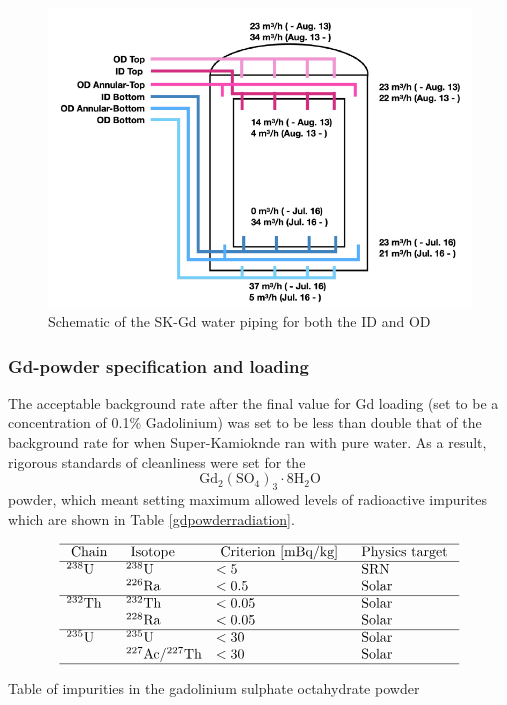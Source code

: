 \begin{figure}[H]
    \includegraphics[width=\textwidth]{Figures/gd_pipes.png}
    \caption{Schematic of the SK-Gd water piping for both the ID and OD}
    \label{fig:gd_pipes}
\end{figure}


\subsubsection{Gd-powder specification and loading}

The acceptable background rate after the final value for Gd loading (set to be a concentration of 0.1\% Gadolinium) was set to be less than double that of the background rate for when Super-Kamioknde ran with pure water. As a result, rigorous standards of cleanliness were set for the $$\mathrm{Gd}_{2}\left(\mathrm{SO}_{4}\right)_{3} \cdot 8 \mathrm{H}_{2} \mathrm{O}$$ powder, which meant setting maximum allowed levels of radioactive impurites which are shown in Table \ref{gdpowderradiation}.


\begin{table}[H]

    $$
    \begin{array}{llll}
    \hline \text { Chain } & \text { Isotope } & \text { Criterion [mBq/kg] } & \text { Physics target } \\
        \hline{ }^{238} \mathrm{U} & { }^{238} \mathrm{U} & <5 & \text { SRN } \\
    & { }^{226} \mathrm{Ra} & <0.5 & \text { Solar } \\
    \hline{ }^{232} \mathrm{Th} & { }^{232} \mathrm{Th} & <0.05 & \text { Solar } \\
    & { }^{228} \mathrm{Ra} & <0.05 & \text { Solar } \\
    \hline{ }^{235} \mathrm{U} & { }^{235} \mathrm{U} & <30 & \text { Solar } \\
    & { }^{227} \mathrm{Ac} /{ }^{227} \mathrm{Th} & <30 & \text { Solar } \\
    \hline
    \end{array}
    $$
\caption{Table of impurities in the gadolinium sulphate octahydrate powder}
\label{gdpowderradiation}
\end{table}


